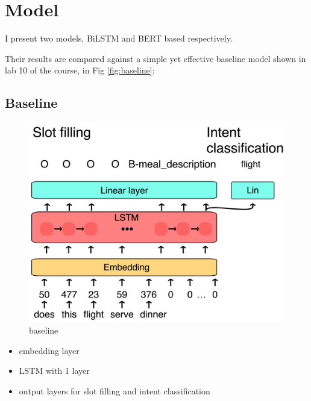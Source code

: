 \documentclass[a4paper]{article}
\begin{document}
\section{Model}

I present two models, BiLSTM and BERT based respectively. 

Their results are compared against a simple yet effective baseline model shown in lab 10 of the course, in Fig \ref{fig:baseline}:

\subsection{Baseline}
\begin{figure}[h!]
	\centering
	\includegraphics[width=0.8\linewidth]{../assets/baseline}
	\caption{baseline}
	\label{fig:Baseline}
\end{figure}
\begin{itemize}
	\item embedding layer
	\item LSTM with 1 layer
	\item output layers for slot filling and intent classification
\end{itemize}
\end{document}
